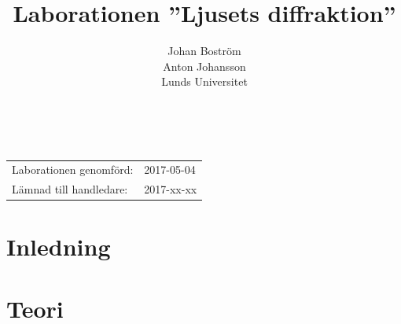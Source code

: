\documentclass[a4paper]{article}
\title{Laborationen ”Ljusets diffraktion”}
\author{Johan Boström\\Anton Johansson\\Lunds Universitet}
\makeatletter
\renewcommand*\maketitle{
  {
    \begin{center}
      {\huge\bfseries \@title}\\
      \vspace{5mm}
      {\large \@author}
    \end{center}
    \vspace{2mm}
  }
}
\makeatother
\begin{document}
\maketitle

\renewcommand{\abstractname}{Abstract} %

\begin{abstract}
  
\end{abstract}

\vspace{2mm}

\hspace{-3mm}
\begin{tabular}{ll}
Laborationen genomförd: &	2017-05-04 \\
Lämnad till handledare: &	2017-xx-xx \\
\end{tabular}

\vspace{3mm}

\section{Inledning}

%

\section{Teori}
\end{document}

